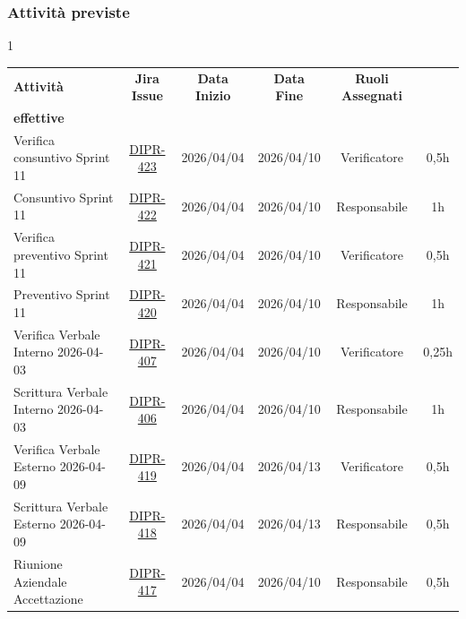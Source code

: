 \documentclass[a4paper,12pt]{article}
\begin{document}
\subsubsection{Attività previste}
\begin{spacing}{1}
    \small
\begin{longtable}{|p{4cm}|c|c|c|c|c|}
        \hline
        \rowcolor{zpusgreen!30}
        \textbf{Attività} & \textbf{Jira Issue} & \textbf{Data Inizio} & \textbf{Data Fine} & \textbf{Ruoli Assegnati} & \begin{tabular}[c]{@{}c@{}} \textbf{Ore} \\ \textbf{effettive} \end{tabular} \\
        \hline
        Verifica consuntivo Sprint 11 & \href{https://7zpus.atlassian.net/browse/DIPR-423}{DIPR-423} & 2026/04/04 & 2026/04/10 & Verificatore & 0,5h \\
        \hline
        Consuntivo Sprint 11 & \href{https://7zpus.atlassian.net/browse/DIPR-422}{DIPR-422} & 2026/04/04 & 2026/04/10 & Responsabile & 1h \\
        \hline
        Verifica preventivo Sprint 11 & \href{https://7zpus.atlassian.net/browse/DIPR-421}{DIPR-421} & 2026/04/04 & 2026/04/10 & Verificatore & 0,5h \\
        \hline
        Preventivo Sprint 11 & \href{https://7zpus.atlassian.net/browse/DIPR-420}{DIPR-420} & 2026/04/04 & 2026/04/10 & Responsabile & 1h \\
        \hline
        Verifica Verbale Interno 2026-04-03 & \href{https://7zpus.atlassian.net/browse/DIPR-407}{DIPR-407} & 2026/04/04 & 2026/04/10 & Verificatore & 0,25h \\
        \hline
        Scrittura Verbale Interno 2026-04-03 & \href{https://7zpus.atlassian.net/browse/DIPR-406}{DIPR-406} & 2026/04/04 & 2026/04/10 & Responsabile & 1h \\
        \hline
        Verifica Verbale Esterno 2026-04-09 & \href{https://7zpus.atlassian.net/browse/DIPR-419}{DIPR-419} & 2026/04/04 & 2026/04/13 & Verificatore & 0,5h \\
        \hline
        Scrittura Verbale Esterno 2026-04-09 & \href{https://7zpus.atlassian.net/browse/DIPR-418}{DIPR-418} & 2026/04/04 & 2026/04/13 & Responsabile & 0,5h \\
        \hline
        Riunione Aziendale Accettazione & \href{https://7zpus.atlassian.net/browse/DIPR-417}{DIPR-417} & 2026/04/04 & 2026/04/10 & Responsabile & 0,5h \\

\end{longtable}
\end{spacing}
\end{document}
